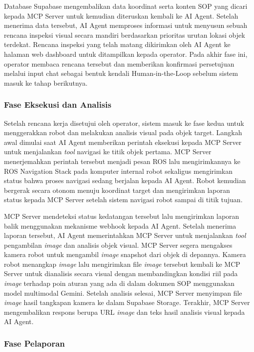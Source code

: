 Database Supabase mengembalikan data koordinat serta konten SOP yang dicari kepada MCP Server untuk kemudian diteruskan kembali ke AI Agent. Setelah menerima data tersebut, AI Agent memproses informasi untuk menyusun sebuah rencana inspeksi visual secara mandiri berdasarkan prioritas urutan lokasi objek terdekat. Rencana inspeksi yang telah matang dikirimkan oleh AI Agent ke halaman web dashboard untuk ditampilkan kepada operator. Pada akhir fase ini, operator membaca rencana tersebut dan memberikan konfirmasi persetujuan melalui input chat sebagai bentuk kendali Human-in-the-Loop sebelum sistem masuk ke tahap berikutnya.

\subsubsection{Fase Eksekusi dan Analisis}

Setelah rencana kerja disetujui oleh operator, sistem masuk ke fase kedua untuk menggerakkan robot dan melakukan analisis visual pada objek target. Langkah awal dimulai saat AI Agent memberikan perintah eksekusi kepada MCP Server untuk menjalankan \textit{tool} navigasi ke titik objek pertama. MCP Server menerjemahkan perintah tersebut menjadi pesan ROS lalu mengirimkannya ke ROS Navigation Stack pada komputer internal robot sekaligus mengirimkan status bahwa proses navigasi sedang berjalan kepada AI Agent. Robot kemudian bergerak secara otonom menuju koordinat target dan mengirimkan laporan status kepada MCP Server setelah sistem navigasi robot sampai di titik tujuan. 

MCP Server mendeteksi status kedatangan tersebut lalu mengirimkan laporan balik menggunakan mekanisme webhook kepada AI Agent. Setelah menerima laporan tersebut, AI Agent memerintahkan MCP Server untuk menjalankan \textit{tool} pengambilan \textit{image} dan analisis objek visual. MCP Server segera mengakses kamera robot untuk mengambil \textit{image} snapshot dari objek di depannya. Kamera robot menangkap \textit{image} lalu mengirimkan file \textit{image} tersebut kembali ke MCP Server untuk dianalisis secara visual dengan membandingkan kondisi riil pada \textit{image} terhadap poin aturan yang ada di dalam dokumen SOP menggunakan model multimodal Gemini. Setelah analisis selesai, MCP Server menyimpan file \textit{image} hasil tangkapan kamera ke dalam Supabase Storage. Terakhir, MCP Server mengembalikan respons berupa URL \textit{image} dan teks hasil analisis visual kepada AI Agent.

\subsubsection{Fase Pelaporan}

